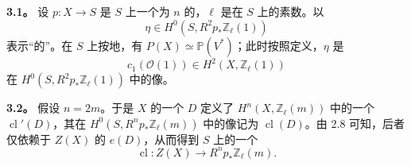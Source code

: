 \textbf{3.1。} 设 $p:X\to S$ 是 $S$ 上一个为 $n$ 的，$\ell$ 是在 $S$ 上的素数。以
\[
\eta\in H^0(S,R^2p_*\mathbb Z_\ell(1))
\]
表示“的”。在 $S$ 上按地，有 $P(X)\simeq\mathbb P(V^*)$；此时按照定义，$\eta$ 是
\[
c_1(\mathscr O(1))\in H^2(X,\mathbb Z_\ell(1))
\]
在 $H^0(S,R^2p_*\mathbb Z_\ell(1))$ 中的像。

\textbf{3.2。} 假设 $n=2m$。于是 $X$ 的一个 $D$ 定义了 $H^n(X,\mathbb Z_\ell(m))$ 中的一个 $\operatorname{cl}'(D)$，其在 $H^0(S,R^np_*\mathbb Z_\ell(m))$ 中的像记为 $\operatorname{cl}(D)$。由 2.8 可知，后者仅依赖于 $Z(X)$ 的 $e(D)$，从而得到 $S$ 上的一个
\[
\operatorname{cl}:Z(X)\longrightarrow R^np_*\mathbb Z_\ell(m).\tag{3.2.1}
\]

